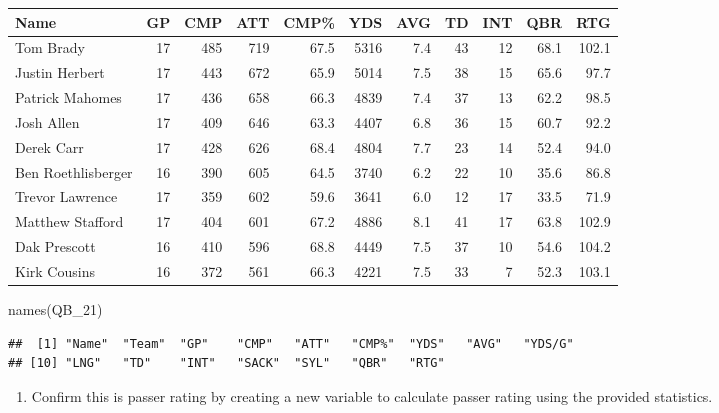 \documentclass[
  11pt,
]{book}
\newenvironment{Shaded}{\begin{snugshade}}{\end{snugshade}}
\newcommand{\FunctionTok}[1]{\textcolor[rgb]{0.00,0.00,0.00}{#1}}
\newcommand{\NormalTok}[1]{#1}
\providecommand{\tightlist}{%
  \setlength{\itemsep}{0pt}\setlength{\parskip}{0pt}}
\theoremstyle{definition}
\theoremstyle{definition}
\theoremstyle{definition}
\theoremstyle{definition}
\theoremstyle{remark}
\begin{document}
\begin{table}[H]
\centering
\begin{tabular}{lrrrrrrrrrr}
\toprule
Name & GP & CMP & ATT & CMP\% & YDS & AVG & TD & INT & QBR & RTG\\
\midrule
Tom Brady & 17 & 485 & 719 & 67.5 & 5316 & 7.4 & 43 & 12 & 68.1 & 102.1\\
Justin Herbert & 17 & 443 & 672 & 65.9 & 5014 & 7.5 & 38 & 15 & 65.6 & 97.7\\
Patrick Mahomes & 17 & 436 & 658 & 66.3 & 4839 & 7.4 & 37 & 13 & 62.2 & 98.5\\
Josh Allen & 17 & 409 & 646 & 63.3 & 4407 & 6.8 & 36 & 15 & 60.7 & 92.2\\
Derek Carr & 17 & 428 & 626 & 68.4 & 4804 & 7.7 & 23 & 14 & 52.4 & 94.0\\
Ben Roethlisberger & 16 & 390 & 605 & 64.5 & 3740 & 6.2 & 22 & 10 & 35.6 & 86.8\\
Trevor Lawrence & 17 & 359 & 602 & 59.6 & 3641 & 6.0 & 12 & 17 & 33.5 & 71.9\\
Matthew Stafford & 17 & 404 & 601 & 67.2 & 4886 & 8.1 & 41 & 17 & 63.8 & 102.9\\
Dak Prescott & 16 & 410 & 596 & 68.8 & 4449 & 7.5 & 37 & 10 & 54.6 & 104.2\\
Kirk Cousins & 16 & 372 & 561 & 66.3 & 4221 & 7.5 & 33 & 7 & 52.3 & 103.1\\
\bottomrule
\end{tabular}
\end{table}

\begin{Shaded}
\begin{Highlighting}[]
\FunctionTok{names}\NormalTok{(QB\_21)}
\end{Highlighting}
\end{Shaded}

\begin{verbatim}
##  [1] "Name"  "Team"  "GP"    "CMP"   "ATT"   "CMP%"  "YDS"   "AVG"   "YDS/G"
## [10] "LNG"   "TD"    "INT"   "SACK"  "SYL"   "QBR"   "RTG"
\end{verbatim}

\begin{enumerate}
\def\labelenumi{(\alph{enumi})}
\tightlist
\item
  Confirm this is passer rating by creating a new variable to calculate passer rating using the provided statistics.
\end{enumerate}
\end{document}
